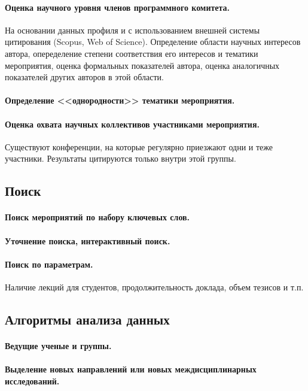 \documentclass[12pt,oneside]{article}
\begin{document}
\paragraph{Оценка научного уровня членов программного комитета.}
На основании данных профиля и с использованием внешней системы цитирования (Scopus, Web of Science).  Определение области научных интересов автора, опеределение степени соответствия его интересов и тематики мероприятия, оценка формальных показателей автора, оценка аналогичных показателей других авторов в этой области. 

\paragraph{Определение <<однородности>> тематики мероприятия.}

\paragraph{Оценка охвата научных коллективов участниками мероприятия.} Существуют конференции, на которые регулярно приезжают одни и теже участники. Результаты цитируются только внутри этой группы.


\subsection{Поиск}
\paragraph{Поиск мероприятий по набору ключевых слов.}
\paragraph{Уточнение поиска, интерактивный поиск.}
\paragraph{Поиск по параметрам.} Наличие лекций для студентов, продолжительность доклада, объем тезисов и т.п.


\subsection{Алгоритмы анализа данных}
\paragraph{Ведущие ученые и группы.}
\paragraph{Выделение новых направлений или новых междисциплинарных исследований.}
\end{document}
